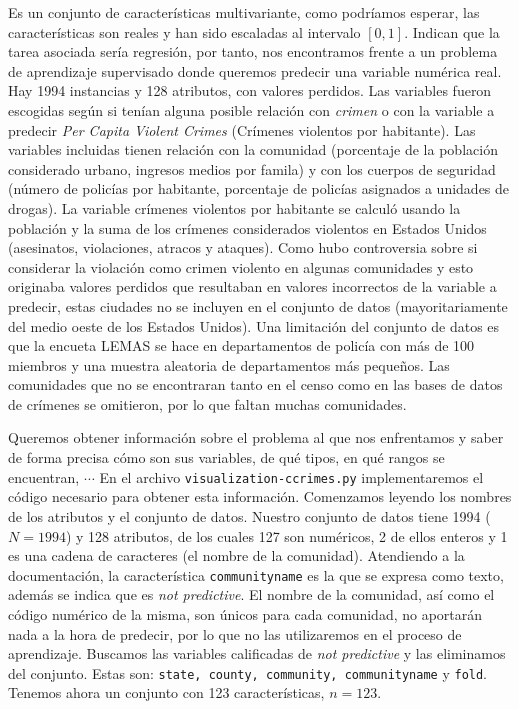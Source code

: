 \documentclass[a4paper, 20pt]{article}
\begin{document}
Es un conjunto de características multivariante, como podríamos esperar, las características son reales y han sido escaladas al intervalo $[0,1]$. Indican que la tarea asociada sería regresión, por tanto, nos encontramos frente a un problema de aprendizaje supervisado donde queremos predecir una variable numérica real. Hay 1994 instancias y 128 atributos, con valores perdidos. Las variables fueron escogidas según si tenían alguna posible relación con \textit{crimen} o con la variable a predecir \textit{Per Capita Violent Crimes} (Crímenes violentos por habitante). Las variables incluidas tienen relación con la comunidad (porcentaje de la población considerado urbano, ingresos medios por famila) y con los cuerpos de seguridad (número de policías por habitante, porcentaje de policías asignados a unidades de drogas). La variable crímenes violentos por habitante se calculó usando la población y la suma de los crímenes considerados violentos en Estados Unidos (asesinatos, violaciones, atracos y ataques). Como hubo controversia sobre si considerar la violación como crimen violento en algunas comunidades y esto originaba valores perdidos que resultaban en valores incorrectos de la variable a predecir, estas ciudades no se incluyen en el conjunto de datos (mayoritariamente del medio oeste de los Estados Unidos). Una limitación del conjunto de datos es que la encueta LEMAS se hace en departamentos de policía con más de 100 miembros y una muestra aleatoria de departamentos más pequeños. Las comunidades que no se encontraran tanto en el censo como en las bases de datos de crímenes se omitieron, por lo que faltan muchas comunidades.

Queremos obtener información sobre el problema al que nos enfrentamos y saber de forma precisa cómo son sus variables, de qué tipos, en qué rangos se encuentran, $\cdots$ En el archivo \texttt{visualization-ccrimes.py} implementaremos el código necesario para obtener esta información. Comenzamos leyendo los nombres de los atributos y el conjunto de datos. Nuestro conjunto de datos tiene 1994 ($N = 1994$) y 128 atributos, de los cuales 127 son numéricos, 2 de ellos enteros y 1 es una cadena de caracteres (el nombre de la comunidad). Atendiendo a la documentación, la característica \texttt{communityname} es la que se expresa como texto, además se indica que es \textit{not predictive}. El nombre de la comunidad, así como el código numérico de la misma, son únicos para cada comunidad, no aportarán nada a la hora de predecir, por lo que no las utilizaremos en el proceso de aprendizaje. Buscamos las variables calificadas de \textit{not predictive} y las eliminamos del conjunto. Estas son: \texttt{state, county, community, communityname} y \texttt{fold}. Tenemos ahora un conjunto con 123 características, $n=123$.
\end{document}
